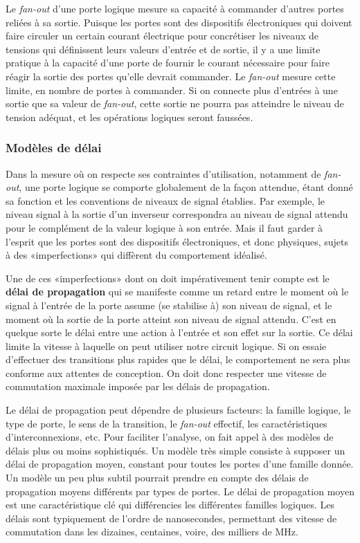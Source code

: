 \documentclass[11pt]{article}
\begin{document}
Le \emph{fan-out} d'une porte logique mesure sa capacité à commander
d'autres portes reliées à sa sortie. Puisque les portes sont des
dispositifs électroniques qui doivent faire circuler un certain
courant électrique pour concrétiser les niveaux de tensions qui
définissent leurs valeurs d'entrée et de sortie, il y a une limite
pratique à la capacité d'une porte de fournir le courant nécessaire
pour faire réagir la sortie des portes qu'elle devrait commander. Le
\emph{fan-out} mesure cette limite, en nombre de portes à commander. Si on
connecte plus d'entrées à une sortie que sa valeur de \emph{fan-out}, cette
sortie ne pourra pas atteindre le niveau de tension adéquat, et les
opérations logiques seront faussées.

\subsubsection{Modèles de délai}
\label{sec:org54668a6}

Dans la mesure où on respecte ses contraintes d'utilisation, notamment
de \emph{fan-out}, une porte logique se comporte globalement de la façon
attendue, étant donné sa fonction et les conventions de niveaux de
signal établies. Par exemple, le niveau signal à la sortie d'un
inverseur correspondra au niveau de signal attendu pour le complément
de la valeur logique à son entrée. Mais il faut garder à l'esprit que
les portes sont des dispositifs électroniques, et donc physiques,
sujets à des «imperfections» qui diffèrent du comportement idéalisé.

Une de ces «imperfections» dont on doit impérativement tenir compte
est le \textbf{délai de propagation} qui se manifeste comme un retard entre
le moment où le signal à l'entrée de la porte assume (se stabilise à)
son niveau de signal, et le moment où la sortie de la porte atteint
son niveau de signal attendu. C'est en quelque sorte le délai entre
une action à l'entrée et son effet sur la sortie. Ce délai limite la
vitesse à laquelle on peut utiliser notre circuit logique. Si on
essaie d'effectuer des transitions plus rapides que le délai, le
comportement ne sera plus conforme aux attentes de conception. On doit
donc respecter une vitesse de commutation maximale imposée par les
délais de propagation.

Le délai de propagation peut dépendre de plusieurs facteurs: la
famille logique, le type de porte, le sens de la transition, le
\emph{fan-out} effectif, les caractéristiques d'interconnexions, etc. Pour
faciliter l'analyse, on fait appel à des modèles de délais plus ou
moins sophistiqués. Un modèle très simple consiste à supposer un délai
de propagation moyen, constant pour toutes les portes d'une famille
donnée. Un modèle un peu plus subtil pourrait prendre en compte des
délais de propagation moyens différents par types de portes. Le délai
de propagation moyen est une caractéristique clé qui différencies les
différentes familles logiques. Les délais sont typiquement de l'ordre
de nanosecondes, permettant des vitesse de commutation dans les
dizaines, centaines, voire, des milliers de MHz.
\end{document}
